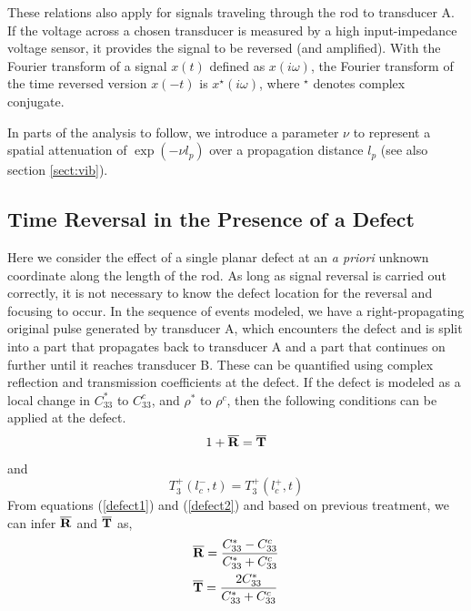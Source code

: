 \documentclass[11pt,letterpaper]{article}%
\begin{document}
These relations also apply for signals traveling through the rod
to transducer A.  If the voltage across a chosen transducer is
measured by a high input-impedance voltage sensor, it provides the
signal to be reversed (and amplified). With the Fourier transform
of a signal $x(t)$ defined as $x(i\omega)$, the Fourier transform
of the time reversed version $x(-t)$ is $x^{\star}(i\omega)$,
where ${}^\star$ denotes complex conjugate.

In parts of the analysis to follow, we introduce a parameter $\nu$
to represent a spatial attenuation of $\exp(-\nu l_p)$ over a
propagation distance $l_p$ (see also section \ref{sect:vib}).


\subsection{Time Reversal in the Presence of a Defect}
\label{sect:timerevth}

Here we consider the effect of a single planar defect at an {\em a
priori} unknown coordinate along the length of the rod.  As long
as signal reversal is carried out correctly, it is not necessary
to know the defect location for the reversal and focusing to
occur.  In the sequence of events modeled, we have a
right-propagating original pulse generated by transducer A, which
encounters the defect and is split into a part that propagates
back to transducer A and a part that continues on further until it
reaches transducer B.  These can be quantified using complex
reflection and transmission coefficients at the defect. If the
defect is modeled as a local change in $C^\ast_{33}$ to
$C^c_{33}$, and $\rho^\ast$ to $\rho^c$, then the following
conditions can be applied at the defect.
\begin{equation}
1+\overline{\bf R} = \overline{\bf T} \label{defect1}
\end{equation}
and
\begin{equation}
T^+_3(l^-_c,t) = T^+_3(l^+_c,t) \label{defect2}
\end{equation}
%
From equations (\ref{defect1}) and (\ref{defect2}) and based on
previous treatment, we can infer $\overline{\bf R}$ and
$\overline{\bf T}$ as,
\begin{align}
&\overline{\bf R} = \frac{C^\ast_{33} - C^c_{33}}{C^\ast_{33} +
C^c_{33}} \nonumber\\
&\overline{\bf T} = \frac{2C^\ast_{33}}{C^\ast_{33}+C^c_{33}}
\label{reftransdef}
\end{align}%
%
%
\end{document}
